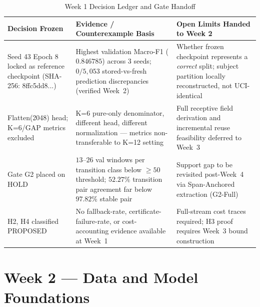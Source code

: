 \documentclass[11pt,oneside,a4paper]{report}
\newcommand{\code}[1]{{\small\upshape\ttfamily #1}}
\theoremstyle{remark}
\begin{document}
\begin{table}[htbp]
\centering\small
\caption{Week 1 Decision Ledger and Gate Handoff}\label{tab:w1_ledger}
\begin{tabularx}{\textwidth}{@{}P{3.6cm}YP{3.8cm}@{}}
\toprule
\textbf{Decision Frozen} & \textbf{Evidence / Counterexample Basis} & \textbf{Open Limits Handed to Week 2} \\
\midrule
Seed 43 Epoch 8 locked as reference checkpoint (\code{SHA-256: 8ffc5dd8...}) & Highest validation Macro-F1 ($0.846785$) across 3 seeds; $0/5{,}053$ stored-vs-fresh prediction discrepancies (verified Week~2) & Whether frozen checkpoint represents a \emph{correct} split; subject partition locally reconstructed, not UCI-identical \\
\addlinespace
\code{Flatten(2048)} head; K=6/GAP metrics excluded & K=6 pure-only denominator, different head, different normalization --- metrics non-transferable to K=12 setting & Full receptive field derivation and incremental reuse feasibility deferred to Week~3 \\
\addlinespace
Gate \code{G2} placed on \code{HOLD} & $13$--$26$ val windows per transition class below $\geq 50$ threshold; $52.27\%$ transition pair agreement far below $97.82\%$ stable pair & Support gap to be revisited post-Week~4 via Span-Anchored extraction (\code{G2-Full}) \\
\addlinespace
H2, H4 classified PROPOSED & No fallback-rate, certificate-failure-rate, or cost-accounting evidence available at Week~1 & Full-stream cost traces required; H3 proof requires Week~3 bound construction \\
\bottomrule
\end{tabularx}
\end{table}

\chapter{Week 2 --- Data and Model Foundations}
\end{document}
